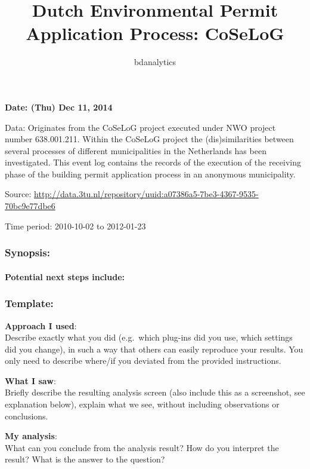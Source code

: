 \documentclass[]{article}
\title{Dutch Environmental Permit Application Process: CoSeLoG}
\author{bdanalytics}
\date{}
\begin{document}
\maketitle


{
\hypersetup{linkcolor=black}
\setcounter{tocdepth}{2}
\tableofcontents
}
\textbf{Date: (Thu) Dec 11, 2014}

Data: Originates from the CoSeLoG project executed under NWO project
number 638.001.211. Within the CoSeLoG project the (dis)similarities
between several processes of different municipalities in the Netherlands
has been investigated. This event log contains the records of the
execution of the receiving phase of the building permit application
process in an anonymous municipality.

Source:
\url{http://data.3tu.nl/repository/uuid:a07386a5-7be3-4367-9535-70bc9e77dbe6}

Time period: 2010-10-02 to 2012-01-23

\subsubsection{Synopsis:}\label{synopsis}

\paragraph{Potential next steps
include:}\label{potential-next-steps-include}

\subsubsection{Template:}\label{template}

\textbf{Approach I used}:\\Describe exactly what you did (e.g.~which
plug-ins did you use, which settings did you change), in such a way that
others can easily reproduce your results. You only need to describe
where/if you deviated from the provided instructions.

\textbf{What I saw}:\\Briefly describe the resulting analysis screen
(also include this as a screenshot, see explanation below), explain what
we see, without including observations or conclusions.

\textbf{My analysis}:\\What can you conclude from the analysis result?
How do you interpret the result? What is the answer to the question?
\end{document}
